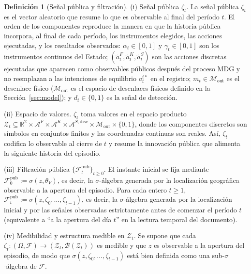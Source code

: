\documentclass[review,authoryear,12pt]{elsarticle}
\theoremstyle{plain}
\theoremstyle{definition}
\newtheorem{definition}[theorem]{Definición}
\newcommand{\1}{\mathbf{1}}
\begin{document}
\begin{definition}[Señal pública y filtración]
\label{def:zeta-filtration}
\noindent\textup{(i)} Señal pública $\zeta_t$.\quad
La señal pública $\zeta_t$ es el vector aleatorio que resume lo que es observable al final del período $t$. El orden de los componentes reproduce la manera en que la historia pública incorpora, al final de cada período, los instrumentos elegidos, las acciones ejecutadas, y los resultados observados:
 $\alpha_t\in[0,1]$ y $\gamma_t\in[0,1]$ son los instrumentos continuos del Estado; $(\tilde{a}_t^F,\tilde{a}_t^K,\tilde{a}_t^S)$ son las acciones discretas ejecutadas que aparecen como observables públicos después del proceso MDG y no reemplazan a las intenciones de equilibrio $a_t^{i\ast}$ en el registro; $m_t\in\mathcal{M}_{\mathrm{out}}$ es el desenlace físico \textup{(}$\mathcal{M}_{\mathrm{out}}$ es el espacio de desenlaces físicos definido en la Sección~\ref{sec:model}\textup{)}; y $d_t\in\{0,1\}$ es la señal de detección.

\medskip
\noindent\textup{(ii)} Espacio de valores.\quad
$\zeta_t$ toma valores en el espacio producto $\mathcal{Z}_t \subseteq \mathbb{R}^2 \times \mathcal{A}^F \times \mathcal{A}^K \times \mathcal{A}^{S,\mathrm{disc}} \times \mathcal{M}_{\mathrm{out}} \times \{0,1\}$, donde los componentes discretos son símbolos en conjuntos finitos y las coordenadas continuas son reales. Así, $\zeta_t$ codifica lo observable al cierre de $t$ y resume la innovación pública que alimenta la siguiente historia del episodio.

\medskip
\noindent\textup{(iii)} Filtración pública $\{\mathcal{F}_t^{\mathrm{pub}}\}_{t\ge 0}$.\quad
El instante inicial se fija mediante $\mathcal{F}_0^{\mathrm{pub}}:=\sigma(z, \theta_V)$, es decir, la $\sigma$-álgebra generada por la localización geográfica observable a la apertura del episodio. Para cada entero $t\ge 1$, $\mathcal{F}_t^{\mathrm{pub}}:=\sigma(z,\zeta_0,\ldots,\zeta_{t-1})$, es decir, la $\sigma$-álgebra generada por la localización inicial y por las señales observadas estrictamente antes de comenzar el período $t$ \textup{(}equivalente a ``a la apertura del día $t$'' en la lectura temporal del documento\textup{)}.

\smallskip
\noindent\textup{(iv)} Medibilidad y estructura medible en $\mathcal{Z}_t$.\quad
Se supone que cada $\zeta_t:(\Omega,\mathcal{F})\to(\mathcal{Z}_t,\mathcal{B}(\mathcal{Z}_t))$ es medible y que $z$ es observable a la apertura del episodio, de modo que $\sigma(z,\zeta_0,\ldots,\zeta_{t-1})$ está bien definida como una sub-$\sigma$-álgebra de $\mathcal{F}$.
\end{definition}
\end{document}

